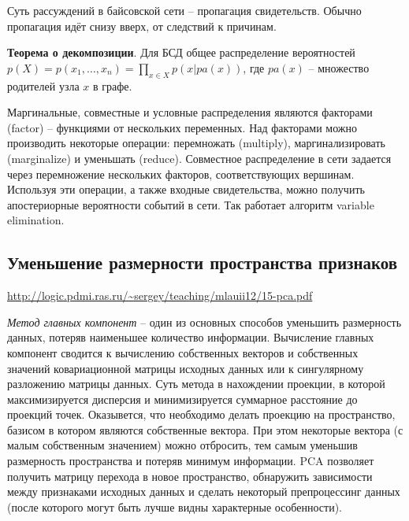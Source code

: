 \documentclass[a4paper,12pt]{article}
\begin{document}
Суть рассуждений в байсовской сети -- пропагация свидетельств. Обычно пропагация идёт снизу вверх, от следствий к причинам.

\textbf{Теорема о декомпозиции}. Для БСД общее распределение вероятностей $p(X)=p(x_1,\dots,x_n)=\prod\limits_{x\in X}p(x|pa(x))$, где $pa(x)$ -- множество родителей узла $x$ в графе.  

Маргинальные, совместные и условные распределения являются факторами (factor) -- функциями от нескольких переменных. Над факторами можно производить некоторые операции: перемножать (multiply), маргинализировать (marginalize) и уменьшать (reduce). Совместное распределение в сети задается через перемножение нескольких факторов, соответствующих вершинам. Используя эти операции, а также входные свидетельства, можно получить апостериорные вероятности событий в сети. Так работает алгоритм variable elimination. 

\subsection*{Уменьшение размерности пространства признаков}
\url{http://logic.pdmi.ras.ru/~sergey/teaching/mlauii12/15-pca.pdf}

\textit{Метод главных компонент} -- один из основных способов уменьшить размерность данных, потеряв наименьшее количество информации. Вычисление главных компонент сводится к вычислению собственных векторов и собственных значений ковариационной матрицы исходных данных или к сингулярному разложению матрицы данных. Суть метода в нахождении проекции, в которой максимизируется дисперсия и минимизируется суммарное расстояние до проекций точек. Оказывется, что необходимо делать проекцию на пространство, базисом в котором являются собственные вектора. При этом некоторые вектора (с малым собственным значением) можно отбросить, тем самым уменьшив размерность пространства и потеряв минимум информации. PCA позволяет получить матрицу перехода в новое пространство, обнаружить зависимости между признаками исходных данных и сделать некоторый препроцессинг данных (после которого могут быть лучше видны характерные особенности).
\end{document}
